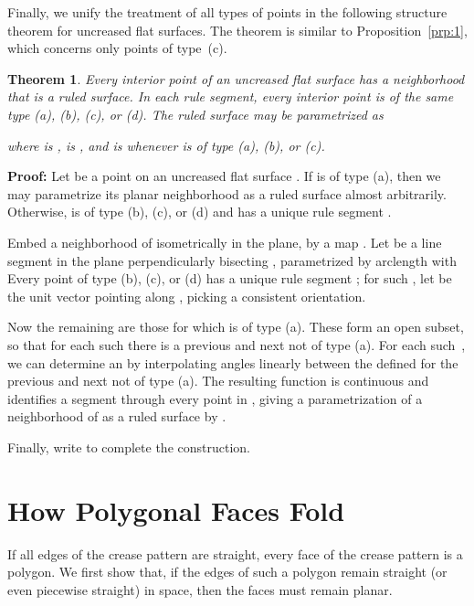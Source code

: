 \documentclass[11pt,letterpaper]{article}
\newtheorem{theorem}{Theorem}
\newenvironment{proof}{\noindent\textbf{Proof: }\ignorespaces}
  {\hspace*{\fill}\medskip}
\begin{document}
Finally, we unify the treatment of all types of points in the
following structure theorem for uncreased flat surfaces.  The theorem
is similar to Proposition~\ref{prp:1}, which concerns only points of
type~(c).

\begin{theorem}
  Every interior point of an uncreased flat surface has a neighborhood that is
  a ruled surface.  In each rule segment, every interior point is of the same
  type (a), (b), (c), or (d).  The ruled surface may be parametrized
  as
  
  where  is ,  is , and  is  whenever
   is of type (a), (b), or (c).
\end{theorem}
\begin{proof}
  Let  be a point on an uncreased flat surface .  If  is of
  type (a), then we may parametrize its planar neighborhood as a ruled
  surface almost arbitrarily.  Otherwise,  is of type (b), (c), or
  (d) and has a unique rule segment .

  Embed a neighborhood  of  isometrically in the
  plane, by a map .  Let  be a line segment
  in the plane perpendicularly bisecting , parametrized by
  arclength with   Every point 
  of type (b), (c), or (d) has a unique rule segment ;
  for such , let  be the unit vector pointing along
  , picking a consistent orientation.

  Now the remaining  are those for which  is of type
  (a).  These  form an open subset, so that for each such  there
  is a previous and next  not of type (a).  For each such~,
  we can determine an  by interpolating angles linearly between
  the  defined for the previous and next  not of type (a).
  The resulting function  is continuous and identifies a
  segment through every point in , giving a parametrization of
  a neighborhood of  as a ruled surface by .

  Finally, write  to complete the construction.
\end{proof}



\section{How Polygonal Faces Fold}

If all edges of the crease pattern are straight,
every face of the crease pattern is a polygon.
We first show that, if the edges of such a polygon remain
straight (or even piecewise straight) in space,
then the faces must remain planar.
\end{document}
